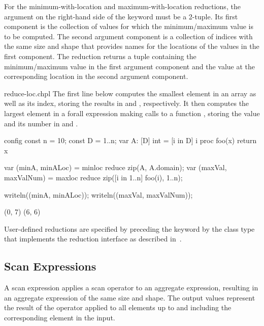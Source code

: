 For the minimum-with-location and maximum-with-location reductions,
the argument on the right-hand side of the  keyword
must be a 2-tuple. Its first component is the collection
of values for which the minimum/maximum value is to be computed.  The
second argument component is a collection of indices with the same size and
shape that provides names for the locations of the values in the first
component.  The reduction returns a tuple containing the
minimum/maximum value in the first argument component and the value
at the corresponding location in the second argument component.

\begin{chapelexample}{reduce-loc.chpl}
The first line below computes the smallest element in an array
 as well as its index, storing the results in  and
, respectively.  It then computes the largest element in
a forall expression making calls to a function , storing
the value and its number in  and .
\begin{chapelnoprint}
config const n = 10;
const D = {1..n};
var A: [D] int = [i in D] i %
proc foo(x) return x %
\end{chapelnoprint}
\begin{chapel}
var (minA, minALoc) = minloc reduce zip(A, A.domain); 
var (maxVal, maxValNum) = maxloc reduce zip([i in 1..n] foo(i), 1..n);
\end{chapel}
\begin{chapelnoprint}
writeln((minA, minALoc));
writeln((maxVal, maxValNum));
\end{chapelnoprint}
\begin{chapeloutput}
(0, 7)
(6, 6)
\end{chapeloutput}
\end{chapelexample}

User-defined reductions are specified by preceding the
keyword  by the class type that implements the reduction
interface as described in~.

\subsection{Scan Expressions}
\label{scan}

A scan expression applies a scan operator to an aggregate expression,
resulting in an aggregate expression of the same size and shape.  The
output values represent the result of the operator applied to all
elements up to and including the corresponding element in the input.

